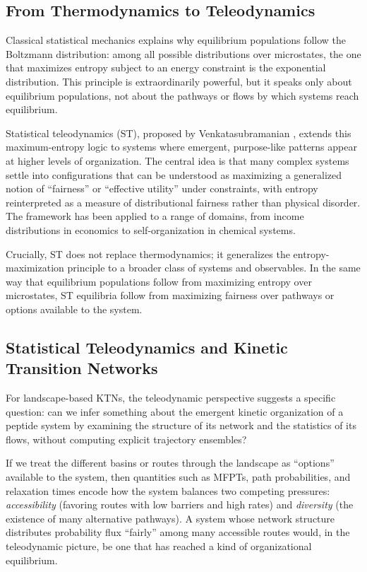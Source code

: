 \subsection{From Thermodynamics to Teleodynamics}

Classical statistical mechanics explains why equilibrium populations follow the Boltzmann distribution: among all possible distributions over microstates, the one that maximizes entropy subject to an energy constraint is the exponential distribution. This principle is extraordinarily powerful, but it speaks only about equilibrium populations, not about the pathways or flows by which systems reach equilibrium.

Statistical teleodynamics (ST), proposed by Venkatasubramanian \cite{Venkatasubramanian2017Teleodynamics}, extends this maximum-entropy logic to systems where emergent, purpose-like patterns appear at higher levels of organization. The central idea is that many complex systems settle into configurations that can be understood as maximizing a generalized notion of ``fairness'' or ``effective utility'' under constraints, with entropy reinterpreted as a measure of distributional fairness rather than physical disorder. The framework has been applied to a range of domains, from income distributions in economics to self-organization in chemical systems.

Crucially, ST does not replace thermodynamics; it generalizes the entropy-maximization principle to a broader class of systems and observables. In the same way that equilibrium populations follow from maximizing entropy over microstates, ST equilibria follow from maximizing fairness over pathways or options available to the system.

\subsection{Statistical Teleodynamics and Kinetic Transition Networks}

For landscape-based KTNs, the teleodynamic perspective suggests a specific question: can we infer something about the emergent kinetic organization of a peptide system by examining the structure of its network and the statistics of its flows, without computing explicit trajectory ensembles?

If we treat the different basins or routes through the landscape as ``options'' available to the system, then quantities such as MFPTs, path probabilities, and relaxation times encode how the system balances two competing pressures: \emph{accessibility} (favoring routes with low barriers and high rates) and \emph{diversity} (the existence of many alternative pathways). A system whose network structure distributes probability flux ``fairly'' among many accessible routes would, in the teleodynamic picture, be one that has reached a kind of organizational equilibrium.

